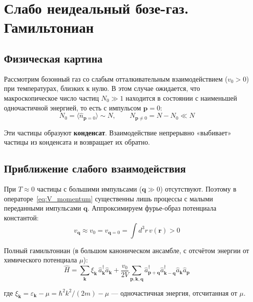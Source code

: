 \documentclass[../general/general]{subfiles}
\begin{document}
\section{Слабо неидеальный бозе-газ. Гамильтониан}

\subsection{Физическая картина}

Рассмотрим бозонный газ со слабым отталкивательным взаимодействием ($v_0 > 0$) при температурах, близких к нулю. В этом случае ожидается, что макроскопическое число частиц $N_0 \gg 1$ находится в состоянии с наименьшей одночастичной энергией, то есть с импульсом $\mathbf{p} = 0$:
\begin{equation}
    N_0 = \langle\hat{n}_{\mathbf{p}=0}\rangle \sim N, \qquad N_{\mathbf{p}\neq 0} = N - N_0 \ll N
\end{equation}

Эти частицы образуют \textbf{конденсат}. Взаимодействие непрерывно «выбивает» частицы из конденсата и возвращает их обратно.

\subsection{Приближение слабого взаимодействия}

При $T \approx 0$ частицы с большими импульсами ($\mathbf{q} \gg 0$) отсутствуют. Поэтому в операторе~\eqref{eq:V_momentum} существенны лишь процессы с малыми переданными импульсами $\mathbf{q}$. Аппроксимируем фурье-образ потенциала константой:
\begin{equation}
    v_\mathbf{q} \approx v_0 = v_{\mathbf{q}=0} = \int d^3r\,v(\mathbf{r}) > 0
    \label{eq:v0_approx}
\end{equation}

Полный гамильтониан (в большом каноническом ансамбле, с отсчётом энергии от химического потенциала $\mu$):
\begin{equation}
    \hat{H} = \sum_\mathbf{k} \xi_\mathbf{k}\,\hat{a}^\dagger_\mathbf{k}\hat{a}_\mathbf{k} + \frac{v_0}{2V}\sum_{\mathbf{p},\mathbf{k},\mathbf{q}} \hat{a}^\dagger_{\mathbf{p}+\mathbf{q}}\hat{a}^\dagger_{\mathbf{k}-\mathbf{q}}\hat{a}_\mathbf{k}\hat{a}_\mathbf{p}
    \label{eq:H_full_bose}
\end{equation}

где $\xi_\mathbf{k} = \varepsilon_\mathbf{k} - \mu = \hbar^2k^2/(2m) - \mu$ --- одночастичная энергия, отсчитанная от $\mu$.
\end{document}
